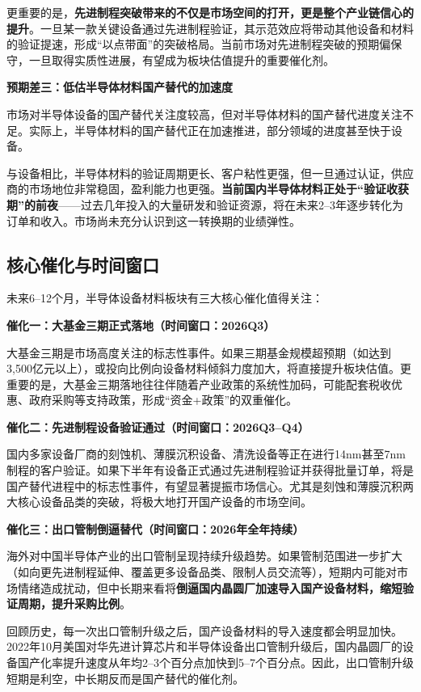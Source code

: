 更重要的是，\textbf{先进制程突破带来的不仅是市场空间的打开，更是整个产业链信心的提升}。一旦某一款关键设备通过先进制程验证，其示范效应将带动其他设备和材料的验证提速，形成“以点带面”的突破格局。当前市场对先进制程突破的预期偏保守，一旦取得实质性进展，有望成为板块估值提升的重要催化剂。

\textbf{预期差三：低估半导体材料国产替代的加速度}

市场对半导体设备的国产替代关注度较高，但对半导体材料的国产替代进度关注不足。实际上，半导体材料的国产替代正在加速推进，部分领域的进度甚至快于设备。

与设备相比，半导体材料的验证周期更长、客户粘性更强，但一旦通过认证，供应商的市场地位非常稳固，盈利能力也更强。\textbf{当前国内半导体材料正处于“验证收获期”的前夜}——过去几年投入的大量研发和验证资源，将在未来2--3年逐步转化为订单和收入。市场尚未充分认识到这一转换期的业绩弹性。

\subsection{核心催化与时间窗口}

未来6--12个月，半导体设备材料板块有三大核心催化值得关注：

\textbf{催化一：大基金三期正式落地（时间窗口：2026Q3）}

大基金三期是市场高度关注的标志性事件。如果三期基金规模超预期（如达到3,500亿元以上），或投向比例向设备材料倾斜力度加大，将直接提升板块估值。更重要的是，大基金三期落地往往伴随着产业政策的系统性加码，可能配套税收优惠、政府采购等支持政策，形成“资金+政策”的双重催化。

\textbf{催化二：先进制程设备验证通过（时间窗口：2026Q3--Q4）}

国内多家设备厂商的刻蚀机、薄膜沉积设备、清洗设备等正在进行14nm甚至7nm制程的客户验证。如果下半年有设备正式通过先进制程验证并获得批量订单，将是国产替代进程中的标志性事件，有望显著提振市场信心。尤其是刻蚀和薄膜沉积两大核心设备品类的突破，将极大地打开国产设备的市场空间。

\textbf{催化三：出口管制倒逼替代（时间窗口：2026年全年持续）}

海外对中国半导体产业的出口管制呈现持续升级趋势。如果管制范围进一步扩大（如向更先进制程延伸、覆盖更多设备品类、限制人员交流等），短期内可能对市场情绪造成扰动，但中长期来看将\textbf{倒逼国内晶圆厂加速导入国产设备材料，缩短验证周期，提升采购比例}。

回顾历史，每一次出口管制升级之后，国产设备材料的导入速度都会明显加快。2022年10月美国对华先进计算芯片和半导体设备出口管制升级后，国内晶圆厂的设备国产化率提升速度从年均2--3个百分点加快到5--7个百分点。因此，出口管制升级短期是利空，中长期反而是国产替代的催化剂。

